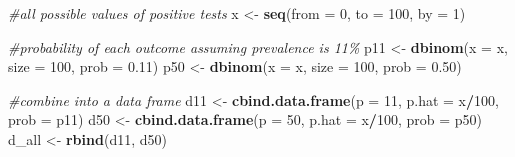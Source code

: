 \documentclass[
]{book}
\newenvironment{Shaded}{\begin{snugshade}}{\end{snugshade}}
\newcommand{\AttributeTok}[1]{\textcolor[rgb]{0.13,0.29,0.53}{#1}}
\newcommand{\CommentTok}[1]{\textcolor[rgb]{0.56,0.35,0.01}{\textit{#1}}}
\newcommand{\DecValTok}[1]{\textcolor[rgb]{0.00,0.00,0.81}{#1}}
\newcommand{\FloatTok}[1]{\textcolor[rgb]{0.00,0.00,0.81}{#1}}
\newcommand{\FunctionTok}[1]{\textcolor[rgb]{0.13,0.29,0.53}{\textbf{#1}}}
\newcommand{\NormalTok}[1]{#1}
\newcommand{\OtherTok}[1]{\textcolor[rgb]{0.56,0.35,0.01}{#1}}
\newcommand{\SpecialCharTok}[1]{\textcolor[rgb]{0.81,0.36,0.00}{\textbf{#1}}}
\begin{document}
\begin{Shaded}
\begin{Highlighting}[]
\CommentTok{\#all possible values of positive tests}
\NormalTok{x }\OtherTok{\textless{}{-}} \FunctionTok{seq}\NormalTok{(}\AttributeTok{from =} \DecValTok{0}\NormalTok{, }\AttributeTok{to =} \DecValTok{100}\NormalTok{, }\AttributeTok{by =} \DecValTok{1}\NormalTok{)}

\CommentTok{\#probability of each outcome assuming prevalence is 11\%}
\NormalTok{p11 }\OtherTok{\textless{}{-}} \FunctionTok{dbinom}\NormalTok{(}\AttributeTok{x =}\NormalTok{ x, }\AttributeTok{size =} \DecValTok{100}\NormalTok{, }\AttributeTok{prob =} \FloatTok{0.11}\NormalTok{)}
\NormalTok{p50 }\OtherTok{\textless{}{-}} \FunctionTok{dbinom}\NormalTok{(}\AttributeTok{x =}\NormalTok{ x, }\AttributeTok{size =} \DecValTok{100}\NormalTok{, }\AttributeTok{prob =} \FloatTok{0.50}\NormalTok{)}

\CommentTok{\#combine into a data frame}
\NormalTok{d11 }\OtherTok{\textless{}{-}} \FunctionTok{cbind.data.frame}\NormalTok{(}\AttributeTok{p =} \DecValTok{11}\NormalTok{, }\AttributeTok{p.hat =}\NormalTok{ x}\SpecialCharTok{/}\DecValTok{100}\NormalTok{, }\AttributeTok{prob =}\NormalTok{ p11)}
\NormalTok{d50 }\OtherTok{\textless{}{-}} \FunctionTok{cbind.data.frame}\NormalTok{(}\AttributeTok{p =} \DecValTok{50}\NormalTok{, }\AttributeTok{p.hat =}\NormalTok{ x}\SpecialCharTok{/}\DecValTok{100}\NormalTok{, }\AttributeTok{prob =}\NormalTok{ p50)}
\NormalTok{d\_all }\OtherTok{\textless{}{-}} \FunctionTok{rbind}\NormalTok{(d11, d50)}


\end{Highlighting}
\end{Shaded}
\end{document}
